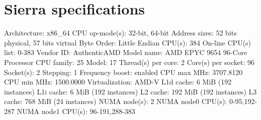 
\clearpage{}
\section{Sierra specifications}\label{appendix:sierra}

\begin{terminal}
Architecture:                       x86_64
CPU op-mode(s):                     32-bit, 64-bit
Address sizes:                      52 bits physical, 57 bits virtual
Byte Order:                         Little Endian
CPU(s):                             384
On-line CPU(s) list:                0-383
Vendor ID:                          AuthenticAMD
Model name:                         AMD EPYC 9654 96-Core Processor
CPU family:                         25
Model:                              17
Thread(s) per core:                 2
Core(s) per socket:                 96
Socket(s):                          2
Stepping:                           1
Frequency boost:                    enabled
CPU max MHz:                        3707.8120
CPU min MHz:                        1500.0000
Virtualization:                     AMD-V
L1d cache:                          6 MiB (192 instances)
L1i cache:                          6 MiB (192 instances)
L2 cache:                           192 MiB (192 instances)
L3 cache:                           768 MiB (24 instances)
NUMA node(s):                       2
NUMA node0 CPU(s):                  0-95,192-287
NUMA node1 CPU(s):                  96-191,288-383
\end{terminal}\leavevmode\newline

